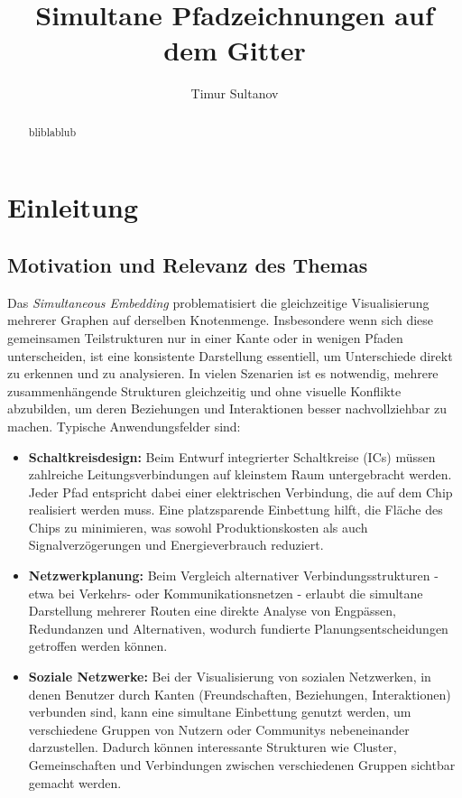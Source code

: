 \documentclass[bachelor, german]{algothesis}
\title{Simultane Pfadzeichnungen auf dem Gitter} %
\author{Timur Sultanov} %
\begin{document}
\begin{abstract}
bliblablub
\end{abstract}

\thesistableofcontents

\chapter{Einleitung}
\section{Motivation und Relevanz des Themas}
Das \emph{Simultaneous Embedding} problematisiert die gleichzeitige Visualisierung mehrerer Graphen auf derselben Knotenmenge. Insbesondere wenn sich diese gemeinsamen Teilstrukturen nur in einer Kante oder in wenigen Pfaden unterscheiden, ist eine konsistente Darstellung essentiell, um Unterschiede direkt zu erkennen und zu analysieren. In vielen Szenarien ist es notwendig, mehrere zusammenhängende Strukturen gleichzeitig und ohne visuelle Konflikte abzubilden, um deren Beziehungen und Interaktionen besser nachvollziehbar zu machen. Typische Anwendungsfelder sind:
\begin{itemize}
  \item \textbf{Schaltkreisdesign:} Beim Entwurf integrierter Schaltkreise (ICs) müssen zahlreiche Leitungsverbindungen auf kleinstem Raum untergebracht werden. Jeder Pfad entspricht dabei einer elektrischen Verbindung, die auf dem Chip realisiert werden muss. Eine platzsparende Einbettung hilft, die Fläche des Chips zu minimieren, was sowohl Produktionskosten als auch Signalverzögerungen und Energieverbrauch reduziert.
  \item \textbf{Netzwerkplanung:} Beim Vergleich alternativer Verbindungsstrukturen - etwa bei Verkehrs- oder Kommunikationsnetzen - erlaubt die simultane Darstellung mehrerer Routen eine direkte Analyse von Engpässen, Redundanzen und Alternativen, wodurch fundierte Planungsentscheidungen getroffen werden können.
  \item \textbf{Soziale Netzwerke:} Bei der Visualisierung von sozialen Netzwerken, in denen Benutzer durch Kanten (Freundschaften, Beziehungen, Interaktionen) verbunden sind, kann eine simultane Einbettung genutzt werden, um verschiedene Gruppen von Nutzern oder Communitys nebeneinander darzustellen. Dadurch können interessante Strukturen wie Cluster, Gemeinschaften und Verbindungen zwischen verschiedenen Gruppen sichtbar gemacht werden.
\end{itemize}
\end{document}
